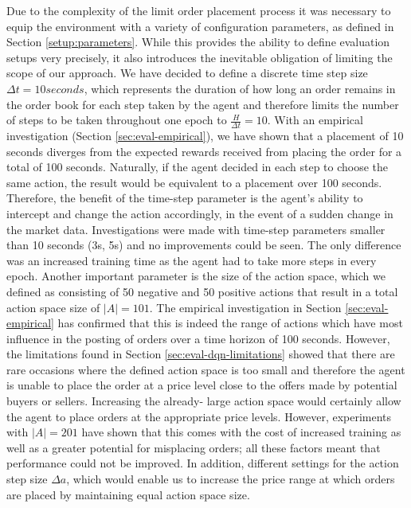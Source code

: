     Due to the complexity of the limit order placement process it was necessary to equip the environment with a variety of configuration parameters, as defined in Section \ref{setup:parameters}.
    While this provides the ability to define evaluation setups very precisely, it also introduces the inevitable obligation of limiting the scope of our approach.
    We have decided to define a discrete time step size $\Delta{t}=10 seconds$, which represents the duration of how long an order remains in the order book for each step taken by the agent and therefore limits the number of steps to be taken throughout one epoch to $\frac{H}{\Delta{t}}=10$.
    With an empirical investigation (Section \ref{sec:eval-empirical}), we have shown that a placement of 10 seconds diverges from the expected rewards received from placing the order for a total of 100 seconds.
    Naturally, if the agent decided in each step to choose the same action, the result would be equivalent to a placement over 100 seconds.
    Therefore, the benefit of the time-step parameter is the agent's ability to intercept and change the action accordingly, in the event of a sudden change in the market data.
    Investigations were made with time-step parameters smaller than 10 seconds (3s, 5s) and no improvements could be seen.
    The only difference was an increased training time as the agent had to take more steps in every epoch.
    Another important parameter is the size of the action space, which we defined as consisting of 50 negative and 50 positive actions that result in a total action space size of $|A|=101$.
    The empirical investigation in Section \ref{sec:eval-empirical} has confirmed that this is indeed the range of actions which have most influence in the posting of orders over a time horizon of 100 seconds.
    However, the limitations found in Section \ref{sec:eval-dqn-limitations} showed that there are rare occasions where the defined action space is too small and therefore the agent is unable to place the order at a price level close to the offers made by potential buyers or sellers.
    Increasing the already- large action space would certainly allow the agent to place orders at the appropriate price levels.
    However, experiments with $|A|=201$ have shown that this comes with the cost of increased training as well as a greater potential for misplacing orders; all these factors meant that performance could not be improved.
    In addition, different settings for the action step size $\Delta{a}$, which would enable us to increase the price range at which orders are placed by maintaining equal action space size.
